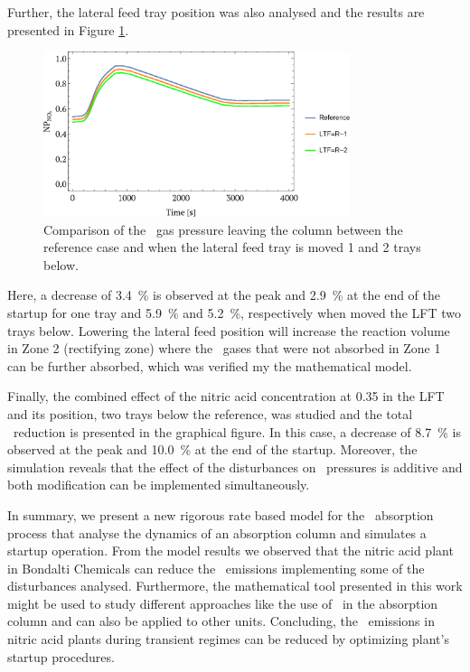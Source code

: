 \documentclass[journal=jacsat,manuscript=article]{achemso}
\newcommand{\nox}{\ce{NO_{\rmfamily{x}}}}
\newcommand{\hdoisodois}{\ce{H2O2}}
\begin{document}
Further, the lateral feed tray position was also analysed and the results are presented in Figure \ref{fig:startp}.
\begin{figure}[htb]
	\centering
	\includegraphics[width=0.8\textwidth]{figure8.eps}
	\caption{Comparison of the \nox~gas pressure leaving the column between the reference case and when the lateral feed tray is moved 1 and 2 trays below.} 	
	\label{fig:startp}
\end{figure}
Here, a decrease of \SI{3.4}{\percent} is observed at the peak and \SI{2.9}{\percent} at the end of the startup for one tray and \SI{5.9}{\percent} and \SI{5.2}{\percent}, respectively when moved the LFT two trays below.
Lowering the lateral feed position will increase the reaction volume in Zone 2 (rectifying zone) where the \nox~gases that were not absorbed in Zone 1 can be further absorbed, which was verified my the mathematical model.  

Finally, the combined effect of the nitric acid concentration at 0.35 in the LFT and its position, two trays below the reference, was studied and the total \nox~reduction is presented in the graphical figure. In this case, a decrease of \SI{8.7}{\percent} is observed at the peak and \SI{10.0}{\percent} at the end of the startup. Moreover, the simulation reveals that the effect of the disturbances on \nox~pressures is additive and both modification can be implemented simultaneously.




In summary, we present a new rigorous rate based model for the \nox~absorption process that analyse the dynamics of an absorption column and simulates a startup operation. From the model results we observed that the nitric acid plant in Bondalti Chemicals can reduce the \nox~emissions implementing some of the disturbances analysed. Furthermore, the mathematical tool presented in this work might be used to study different approaches like the use of \hdoisodois~in the absorption column and can also be applied to other units.  Concluding, the \nox~emissions in nitric acid plants during transient regimes can be reduced by optimizing plant's startup procedures. 
\end{document}
